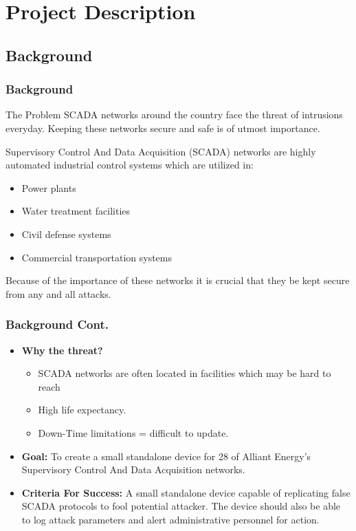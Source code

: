 \section{Project Description}

\subsection{Background}
\begin{frame}
\frametitle{Background}

\begin{block}{The Problem}
SCADA networks around the country face the threat of intrusions everyday. Keeping these networks secure and safe is of utmost importance.
\end{block}

Supervisory Control And Data Acquisition (SCADA) networks are highly automated industrial control systems which are utilized in:
\begin{itemize} %
\item Power plants
\item Water treatment facilities
\item Civil defense systems
\item Commercial transportation systems
\end{itemize}
    Because of the importance of these networks it is crucial that they be kept secure from any and all attacks.
\end{frame}



\begin{frame}
\frametitle{Background Cont.}

\begin{itemize}
\item \textbf{Why the threat? } \begin{itemize}\item SCADA networks are often located in facilities which may be hard to reach
\item High life expectancy.
\item Down-Time limitations = difficult to update.
\end{itemize} 
\item \textbf{Goal: }To create a small standalone device for 28 of Alliant Energy's Supervisory Control  And Data Acquisition networks.
\item \textbf{Criteria For Success: }A small standalone device capable of replicating false  SCADA protocols to fool potential attacker.  The device should also be able to log  attack parameters and alert administrative personnel for action.
\end{itemize}


\end{frame}


